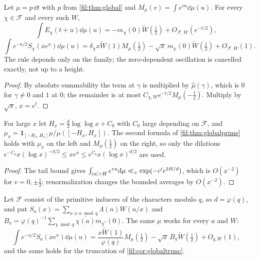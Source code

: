 \begin{theorem}\label{fil:thm:globalprime}
Let $\mu=p\,\dd t$ with $p$ from \cref{fil:thm:global} and $M_\mu(v)=\int e^{vu}\dd\mu(u)$. For every $\chi\in\mathcal F$
and every such $W$,
\[
 \int E_\chi(t+u)\dd\mu(u)=-m_\chi(0)\widetilde W(\tfrac12)+O_{\mathcal F,W}(e^{-t/2}),\]
\[
 \int e^{-u/2}S_\chi(xe^u)\dd\mu(u)=\delta_\chi x\widetilde W(1)M_\mu(\tfrac12)-\sqrt x\,m_\chi(0)\widetilde W(\tfrac12)+O_{\mathcal F,W}(1).
\]
The rule depends only on the family; the zero-dependent oscillation is cancelled exactly, not up to a height.
\end{theorem}

\begin{proof}
By absolute summability the term at $\gamma$ is multiplied by $\widehat\mu(\gamma)$, which is $0$ for $\gamma\ne0$ and
$1$ at $0$; the remainder is at most $C_{\chi,W}e^{-t/2}M_\mu(-\tfrac12)$. Multiply by $\sqrt x$, $x=e^t$.
\end{proof}

\begin{corollary}\label{fil:cor:globaltrunc}
For large $x$ let $H_x=\frac d2\log\log x+C_0$ with $C_0$ large depending on $\mathcal F$, and
$\mu_x=\mathbf1_{[-H_x,H_x]}\mu/\mu([-H_x,H_x])$. The second formula of \cref{fil:thm:globalprime} holds with
$\mu_x$ on the left and $M_\mu(\tfrac12)$ on the right, so only the dilations
$e^{-C_0}x(\log x)^{-d/2}\le xe^u\le e^{C_0}x(\log x)^{d/2}$ are used.
\end{corollary}

\begin{proof}
The tail bound gives $\int_{\lvert u\rvert>H}e^{vu}\mathrm{d}\mu\ll_v\exp(-c'e^{2H/d})$, which is $O(x^{-2})$ for $v=0,\pm\tfrac12$;
renormalization changes the bounded averages by $O(x^{-2})$.
\end{proof}

\begin{corollary}\label{fil:cor:globalres}
Let $\mathcal F$ consist of the primitive inducers of the characters modulo $q$, so $d=\varphi(q)$, and put
$S_a(x)=\sum_{n\equiv a\bmod q}\Lambda(n)W(n/x)$ and $B_a=\varphi(q)^{-1}\sum_{\chi\bmod q}\overline{\chi(a)}m_{\chi^*}(0)$.
The same $\mu$ works for every $a$ and $W$:
\[
 \int e^{-u/2}S_a(xe^u)\dd\mu(u)=\frac{x\widetilde W(1)}{\varphi(q)}M_\mu(\tfrac12)-\sqrt x\,B_a\widetilde W(\tfrac12)+O_{q,W}(1),
\]
and the same holds for the truncation of \cref{fil:cor:globaltrunc}.
\end{corollary}

